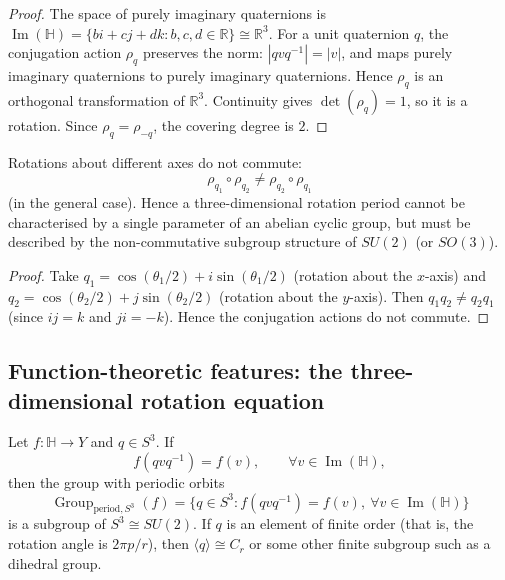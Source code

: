 \begin{proof}
The space of purely imaginary quaternions is $\operatorname{Im}(\mathbb{H}) = \{bi + cj + dk : b,c,d \in \mathbb{R}\} \cong \mathbb{R}^3$. For a unit quaternion $q$, the conjugation action $\rho_q$ preserves the norm: $|qvq^{-1}| = |v|$, and maps purely imaginary quaternions to purely imaginary quaternions. Hence $\rho_q$ is an orthogonal transformation of $\mathbb{R}^3$. Continuity gives $\det(\rho_q) = 1$, so it is a rotation. Since $\rho_q = \rho_{-q}$, the covering degree is $2$.
\end{proof}

\begin{theorem}\label{thm:noncommutative_period}
Rotations about different axes do not commute:
\[
\rho_{q_1} \circ \rho_{q_2} \neq \rho_{q_2} \circ \rho_{q_1}
\]
(in the general case). Hence a three-dimensional rotation period cannot be characterised by a single parameter of an abelian cyclic group, but must be described by the non-commutative subgroup structure of $SU(2)$ (or $SO(3)$).
\end{theorem}

\begin{proof}
Take $q_1 = \cos(\theta_1/2) + i\sin(\theta_1/2)$ (rotation about the $x$-axis) and $q_2 = \cos(\theta_2/2) + j\sin(\theta_2/2)$ (rotation about the $y$-axis). Then $q_1 q_2 \neq q_2 q_1$ (since $ij = k$ and $ji = -k$). Hence the conjugation actions do not commute.
\end{proof}

\subsection{\texorpdfstring{Function-theoretic features: the three-dimensional rotation equation}{Function-theoretic features: the three-dimensional rotation equation}}

\begin{theorem}\label{thm:rotation_equation_H}
Let $f:\mathbb{H}\to Y$ and $q\in S^3$. If
\[
f(qvq^{-1})=f(v),\qquad \forall v\in\operatorname{Im}(\mathbb{H}),
\]
then the group with periodic orbits
\[
\operatorname{Group}_{\mathrm{period},S^3}(f)=\{q\in S^3: f(qvq^{-1})=f(v),\ \forall v\in\operatorname{Im}(\mathbb{H})\}
\]
is a subgroup of $S^3\cong SU(2)$. If $q$ is an element of finite order (that is, the rotation angle is $2\pi p/r$), then $\langle q\rangle\cong C_r$ or some other finite subgroup such as a dihedral group.
\end{theorem}

